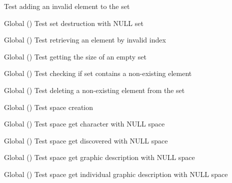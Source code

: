 \begin{DoxyRefList}
Test adding an invalid element to the set  
\item[Global \doxylink{set__test_8h_a8418524584e638fc6f2d03f726db61f1}{test2\+\_\+set\+\_\+destroy} ()]\label{test__test000118}%
%
Test set destruction with NULL set  
\item[Global \doxylink{set__test_8c_af868199a6847e38eab42e8363181f0ee}{test2\+\_\+set\+\_\+get\+\_\+id\+\_\+from\+\_\+index} ()]\label{test__test000128}%
%
Test retrieving an element by invalid index  
\item[Global \doxylink{set__test_8h_aaadf761f34e98a3a6d214cc2598ee852}{test2\+\_\+set\+\_\+get\+\_\+num\+\_\+ids} ()]\label{test__test000126}%
%
Test getting the size of an empty set  
\item[Global \doxylink{set__test_8c_a27ba936110dfc23be0d0d3b9ebf07161}{test2\+\_\+set\+\_\+has\+\_\+id} ()]\label{test__test000124}%
%
Test checking if set contains a non-\/existing element  
\item[Global \doxylink{set__test_8c_ae89af247bc1f5811ae037774e1920ff7}{test2\+\_\+set\+\_\+remove\+\_\+id} ()]\label{test__test000122}%
%
Test deleting a non-\/existing element from the set  
\item[Global \doxylink{space__test_8c_a012cd3cf37a8d91e2d7098a264c29d65}{test2\+\_\+space\+\_\+create} ()]\label{test__test000130}%
%
Test space creation  
\item[Global \doxylink{space__test_8c_a265ce3822740dbbd82b847437ff415ea}{test2\+\_\+space\+\_\+get\+\_\+character} ()]\label{test__test000158}%
%
Test space get character with NULL space  
\item[Global \doxylink{space__test_8c_a64ea5465e55d87db62b95d88d6ecfb69}{test2\+\_\+space\+\_\+get\+\_\+discovered} ()]\label{test__test000152}%
%
Test space get discovered with NULL space  
\item[Global \doxylink{space__test_8c_a3422f19fd8a821a06ccba2feb52034c2}{test2\+\_\+space\+\_\+get\+\_\+gdesc} ()]\label{test__test000150}%
%
Test space get graphic description with NULL space  
\item[Global \doxylink{space__test_8c_a4f9ada1e7b9847c4c2ecab52f92c7f72}{test2\+\_\+space\+\_\+get\+\_\+i\+\_\+description} ()]\label{test__test000164}%
%
Test space get individual graphic description with NULL space  

\end{DoxyRefList}
